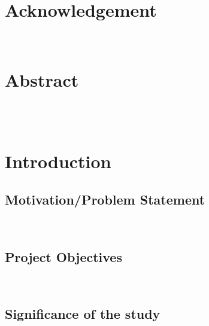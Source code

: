 \documentclass[12pt]{article}
\begin{document}
\newpage
{}
\setcounter{page}{1}

\section{Acknowledgement}
\\
\newpage



\section{Abstract}
\\\\
\newpage

\newpage
\tableofcontents
\newpage
\listoffigures
\newpage
\listoftables
\newpage

\section{Introduction}

\subsection{Motivation/Problem Statement}
\\

\subsection{Project Objectives}
\\


\subsection{Significance of the study}
\\

\newpage

% 
\end{document}
